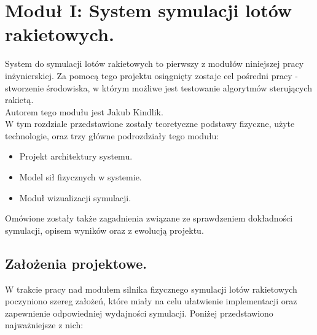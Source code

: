\chapter{Moduł I: System symulacji lotów rakietowych.}
\label{ch:silnik-fizyczny-symulacji-lotow-rakietowych.}

System do symulacji lotów rakietowych to pierwszy z modułów
niniejszej pracy inżynierskiej.
Za pomocą tego projektu osiągnięty zostaje
cel pośredni pracy - stworzenie środowiska, w którym możliwe jest testowanie algorytmów sterujących rakietą.\\
Autorem
tego modułu jest Jakub Kindlik.\\
W tym rozdziale przedstawione zostały teoretyczne podstawy fizyczne, użyte technologie, oraz trzy główne podrozdziały tego modułu:

\begin{itemize}
    \item Projekt architektury systemu.
    \item Model sił fizycznych w systemie.
    \item Moduł wizualizacji symulacji.
\end{itemize}

Omówione zostały także zagadnienia związane ze
sprawdzeniem dokładności symulacji, opisem wyników oraz z ewolucją projektu.\\

\section{Założenia projektowe.}\label{sec:zalozenia-projektowe.}
W trakcie pracy nad modułem silnika fizycznego symulacji lotów rakietowych poczyniono szereg założeń, które miały na celu ułatwienie implementacji oraz zapewnienie odpowiedniej wydajności symulacji. Poniżej przedstawiono najważniejsze z nich:

